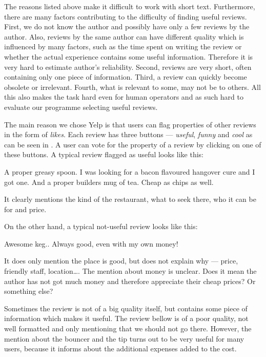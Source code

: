 The reasons listed above make it difficult to work with short text.
Furthermore, there are many factors contributing to the difficulty of finding useful reviews.
First, we do not know the author and possibly have only a few reviews by the author.
Also, reviews by the same author can have different quality which is influenced by many factors,
such as the time spent on writing the review or whether the actual experience contains some useful information.
Therefore it is very hard to estimate author's reliability.
Second, reviews are very short, often containing only one piece of information.
Third, a review can quickly become obsolete or irrelevant.
Fourth, what is relevant to some, may not be to others.
All this also makes the task hard even for human operators and as such hard to evaluate our programme selecting useful reviews.

The main reason we chose Yelp is that users can flag properties of other reviews in the form of \emph{likes}.
Each review has three buttons --- \emph{useful}, \emph{funny} and \emph{cool} as can be seen in .
A user can vote for the property of a review by clicking on one of these buttons.
A typical review flagged as useful looks like this:

\begin{code}
A proper greasy spoon.
I was looking for a bacon flavoured hangover cure and I got one.
And a proper builders mug of tea.
Cheap as chips as well.
\end{code}

It clearly mentions the kind of the restaurant, what to seek there,
who it can be for and price.

On the other hand, a typical not-useful review looks like this:

\begin{code}
Awesome keg.. Always good, even with my own money!
\end{code}

It does only mention the place is good, but does not explain why --- price, friendly staff, location\dots.
The mention about money is unclear.
Does it mean the author has not got much money and therefore appreciate their cheap prices? Or something else?

Sometimes the review is not of a big quality itself, but contains some piece of information which makes it useful.
The review bellow is of a poor quality, not well formatted and only mentioning that we should not go there.
However, the mention about the bouncer and the tip turns out to be very useful for many users,
because it informs about the additional expenses added to the cost.

